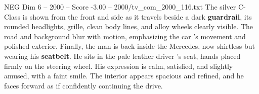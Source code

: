 \begin{textsample}{NEG Dim 6 – 2000 – Score -3.00 – 2000/tv\_com\_2000\_116.txt}
The silver C-Class is shown from the front and side as it travels beside a dark \textbf{guardrail}, its rounded headlights, grille, clean body lines, and alloy wheels clearly visible.
The road and background blur with motion, emphasizing the car ’s movement and polished exterior.
Finally, the man is back inside the Mercedes, now shirtless but wearing his \textbf{seatbelt}.
He sits in the pale leather driver ’s seat, hands placed firmly on the steering wheel.
His expression is calm, satisfied, and slightly amused, with a faint smile.
The interior appears spacious and refined, and he faces forward as if confidently continuing the drive.

\end{textsample}
